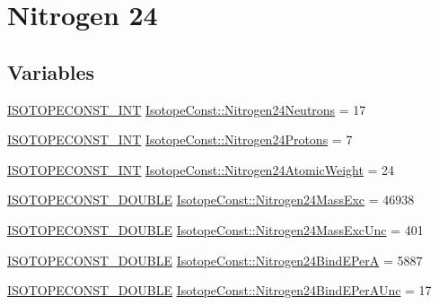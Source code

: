 \hypertarget{group___isotope_const-_nitrogen-_n24}{}\section{Nitrogen 24}
\label{group___isotope_const-_nitrogen-_n24}
\subsection*{Variables}
\begin{DoxyCompactItemize}
\item 
\mbox{\hyperlink{group___isotope_const-_macros_ga5f18360b3e99483a35c32d789e62621c}{I\+S\+O\+T\+O\+P\+E\+C\+O\+N\+S\+T\+\_\+\+I\+NT}} \mbox{\hyperlink{group___isotope_const-_nitrogen-_n24_ga29583bff83b8fe3313426c84141e1d6c}{Isotope\+Const\+::\+Nitrogen24\+Neutrons}} = 17
\item 
\mbox{\hyperlink{group___isotope_const-_macros_ga5f18360b3e99483a35c32d789e62621c}{I\+S\+O\+T\+O\+P\+E\+C\+O\+N\+S\+T\+\_\+\+I\+NT}} \mbox{\hyperlink{group___isotope_const-_nitrogen-_n24_gad7c5b585746c6070cbbb90b216af5934}{Isotope\+Const\+::\+Nitrogen24\+Protons}} = 7
\item 
\mbox{\hyperlink{group___isotope_const-_macros_ga5f18360b3e99483a35c32d789e62621c}{I\+S\+O\+T\+O\+P\+E\+C\+O\+N\+S\+T\+\_\+\+I\+NT}} \mbox{\hyperlink{group___isotope_const-_nitrogen-_n24_ga493934ec4956fcd91460e67b84bdf3ef}{Isotope\+Const\+::\+Nitrogen24\+Atomic\+Weight}} = 24
\item 
\mbox{\hyperlink{group___isotope_const-_macros_ga8f45a7272ce02c0b4c65c44636ed719a}{I\+S\+O\+T\+O\+P\+E\+C\+O\+N\+S\+T\+\_\+\+D\+O\+U\+B\+LE}} \mbox{\hyperlink{group___isotope_const-_nitrogen-_n24_gaf382544264edbb77754e1dc18bf31c95}{Isotope\+Const\+::\+Nitrogen24\+Mass\+Exc}} = 46938
\item 
\mbox{\hyperlink{group___isotope_const-_macros_ga8f45a7272ce02c0b4c65c44636ed719a}{I\+S\+O\+T\+O\+P\+E\+C\+O\+N\+S\+T\+\_\+\+D\+O\+U\+B\+LE}} \mbox{\hyperlink{group___isotope_const-_nitrogen-_n24_gadd322a1a4f1afbfef17346be33cc3e96}{Isotope\+Const\+::\+Nitrogen24\+Mass\+Exc\+Unc}} = 401
\item 
\mbox{\hyperlink{group___isotope_const-_macros_ga8f45a7272ce02c0b4c65c44636ed719a}{I\+S\+O\+T\+O\+P\+E\+C\+O\+N\+S\+T\+\_\+\+D\+O\+U\+B\+LE}} \mbox{\hyperlink{group___isotope_const-_nitrogen-_n24_ga9cdaaf0aa2477da136f3c7c8e874ab4a}{Isotope\+Const\+::\+Nitrogen24\+Bind\+E\+PerA}} = 5887
\item 
\mbox{\hyperlink{group___isotope_const-_macros_ga8f45a7272ce02c0b4c65c44636ed719a}{I\+S\+O\+T\+O\+P\+E\+C\+O\+N\+S\+T\+\_\+\+D\+O\+U\+B\+LE}} \mbox{\hyperlink{group___isotope_const-_nitrogen-_n24_ga562bf7d1c3e4b94ac3ebb5ba6f5abd37}{Isotope\+Const\+::\+Nitrogen24\+Bind\+E\+Per\+A\+Unc}} = 17

\end{DoxyCompactItemize}

